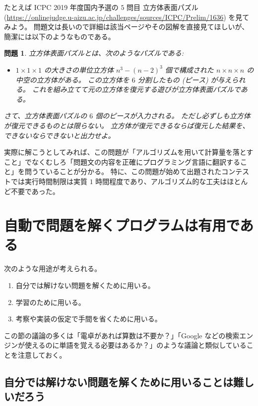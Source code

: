 \documentclass{ltjsarticle}
\newtheorem{problem*}{問題}[section]
\newenvironment{problem}{\begin{problem*}\renewcommand{\qedsymbol}{\(\diamond\)}\pushQED{\qed}}{\popQED\end{problem*}}
\begin{document}
たとえば ICPC 2019 年度国内予選の $5$ 問目 立方体表面パズル (\url{https://onlinejudge.u-aizu.ac.jp/challenges/sources/ICPC/Prelim/1636}) を見てみよう。
問題文は長いので詳細は該当ページやその図解を直接見てほしいが、簡潔には以下のようなものである。

\begin{problem}
    \label{cube-surface-puzzle}
    立方体表面パズルとは、次のようなパズルである:
    \begin{itemize}
        \item $1 \times 1 \times 1$ の大きさの単位立方体 $n^3 - (n - 2)^3$ 個で構成された $n \times n \times n$ の中空の立方体がある。
            この立方体を $6$ 分割したもの (ピース) が与えられる。
            これを組み立てて元の立方体を復元する遊びが立方体表面パズルである。
    \end{itemize}
    さて、立方体表面パズルの $6$ 個のピースが入力される。
    ただし必ずしも立方体が復元できるものとは限らない。
    立方体が復元できるならば復元した結果を、できないならできないと出力せよ。
\end{problem}

実際に解こうとしてみれば、この問題が「アルゴリズムを用いて計算量を落とすこと」でなくむしろ「問題文の内容を正確にプログラミング言語に翻訳すること」を問うていることが分かる。
特に、この問題が始めて出題されたコンテストでは実行時間制限は実質 $1$ 時間程度であり、アルゴリズム的な工夫はほとんど不要であった。


\section{自動で問題を解くプログラムは有用である}

次のような用途が考えられる。

\begin{enumerate}[label=(\arabic{enumi}.)]
    \item 自分では解けない問題を解くために用いる。
    \item 学習のために用いる。
    \item 考察や実装の仮定で手間を省くために用いる。
\end{enumerate}

この節の議論の多くは「電卓があれば算数は不要か？」「Google などの検索エンジンが使えるのに単語を覚える必要はあるか？」のような議論と類似していることを注意しておく。

\subsection{自分では解けない問題を解くために用いることは難しいだろう}
\end{document}
